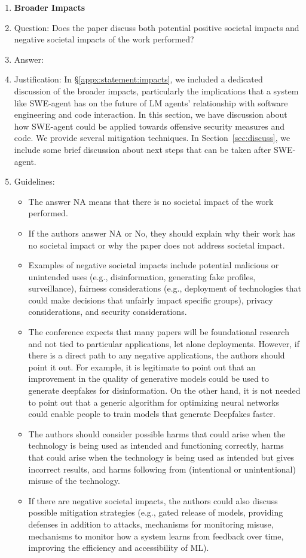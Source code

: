 \begin{enumerate}
\item {\bf Broader Impacts}
    \item[] Question: Does the paper discuss both potential positive societal impacts and negative societal impacts of the work performed?
    \item[] Answer: \answerYes{}
    \item[] Justification: In \S\ref{appx:statement:impacts}, we included a dedicated discussion of the broader impacts, particularly the implications that a system like SWE-agent has on the future of LM agents' relationship with software engineering and code interaction. In this section, we have discussion about how SWE-agent could be applied towards offensive security measures and code. We provide several mitigation techniques. In Section~\ref{sec:discuss}, we include some brief discussion about next steps that can be taken after SWE-agent.
    \item[] Guidelines:
    \begin{itemize}
        \item The answer NA means that there is no societal impact of the work performed.
        \item If the authors answer NA or No, they should explain why their work has no societal impact or why the paper does not address societal impact.
        \item Examples of negative societal impacts include potential malicious or unintended uses (e.g., disinformation, generating fake profiles, surveillance), fairness considerations (e.g., deployment of technologies that could make decisions that unfairly impact specific groups), privacy considerations, and security considerations.
        \item The conference expects that many papers will be foundational research and not tied to particular applications, let alone deployments. However, if there is a direct path to any negative applications, the authors should point it out. For example, it is legitimate to point out that an improvement in the quality of generative models could be used to generate deepfakes for disinformation. On the other hand, it is not needed to point out that a generic algorithm for optimizing neural networks could enable people to train models that generate Deepfakes faster.
        \item The authors should consider possible harms that could arise when the technology is being used as intended and functioning correctly, harms that could arise when the technology is being used as intended but gives incorrect results, and harms following from (intentional or unintentional) misuse of the technology.
        \item If there are negative societal impacts, the authors could also discuss possible mitigation strategies (e.g., gated release of models, providing defenses in addition to attacks, mechanisms for monitoring misuse, mechanisms to monitor how a system learns from feedback over time, improving the efficiency and accessibility of ML).
    \end{itemize}
    

\end{enumerate}
